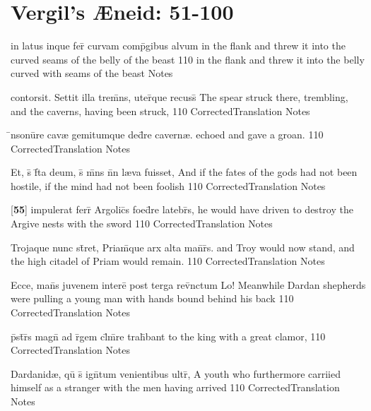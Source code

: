 \section{Vergil's {\AE}neid: 51-100} %

\latline
  {in latus inque fer\={\macron {\i}} curvam comp\={}gibus alvum}
  { in the flank and threw it into the curved seams of the belly of the beast }
  {110}
  { in the flank and threw it into the belly curved with seams of the beast }
  { Notes }


\latline
  {contorsit.  Settit illa trem\={}ns, uter\={}que recuss\={}}
  { The spear struck there, trembling, and the caverns, having been struck, }
  {110}
  { CorrectedTranslation }
  { Notes }


\latline
  {\={\macron {\i}}nsonu\={}re cav{\ae} gemitumque ded\={}re cavern{\ae}.}
  { echoed and gave a groan. }
  {110}
  { CorrectedTranslation }
  { Notes }


\latline
  {Et, s\={\macron {\i}} f\={}ta deum, s\={\macron {\i}} m\={}ns n\={}n l{\ae}va fuisset,}
  { And if the fates of the gods had not been hostile, if the mind had not been foolish  }
  {110}
  { CorrectedTranslation }
  { Notes }


\latline
  {[\textbf{55}] impulerat ferr\={} Argolic\={}s foed\={}re latebr\={}s,}
  { he would have driven to destroy the Argive nests with the sword }
  {110}
  { CorrectedTranslation }
  { Notes }


\latline
  {Trojaque nunc st\={}ret, Priam\={\macron {\i}}que arx alta man\={}r\={}s.}
  { and Troy would now stand, and the high citadel of Priam would remain. }
  {110}
  { CorrectedTranslation }
  { Notes }


\latline
  {Ecce, man\={}s juvenem intere\={} post terga rev\={\macron {\i}}nctum}
  { Lo!  Meanwhile Dardan shepherds were pulling a young man with hands bound behind his back }
  {110}
  { CorrectedTranslation }
  { Notes }


\latline
  {p\={}st\={}r\={}s magn\={} ad r\={}gem cl\={}m\={}re trah\={}bant}
  { to the king with a great clamor,  }
  {110}
  { CorrectedTranslation }
  { Notes }


\latline
  {Dardanid{\ae}, qu\={\macron {\i}} s\={} ign\={}tum venientibus ultr\={},}
  { A youth who furthermore carriied himself as a stranger with the men having arrived }
  {110}
  { CorrectedTranslation }
  { Notes }


